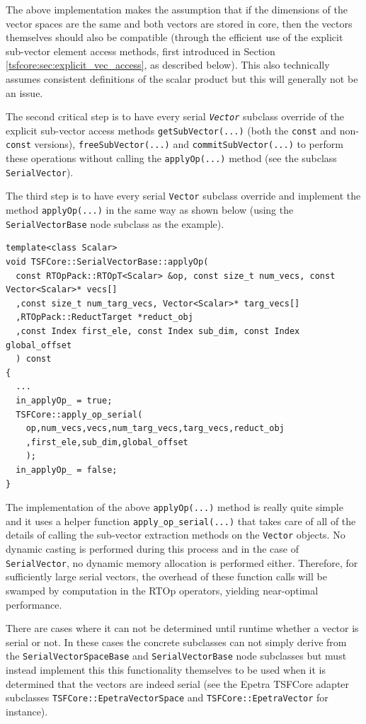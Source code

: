 {}\noindent{}The above implementation makes the assumption that if the
dimensions of the vector spaces are the same and both vectors are
stored in core, then the vectors themselves should also be compatible
(through the efficient use of the explicit sub-vector element access
methods, first introduced in Section
{}\ref{tsfcore:sec:explicit_vec_access}, as described below).  This
also technically assumes consistent definitions of the scalar product
but this will generally not be an issue.

The second critical step is to have every serial
{}\texttt{\textit{Vector}} subclass override of the explicit
sub-vector access methods {}\texttt{getSubVector(...)} (both the
{}\texttt{const} and non-\texttt{const} versions),
{}\texttt{free\-Sub\-Vector(...)} and
{}\texttt{commit\-Sub\-Vector(...)} to perform these operations
without calling the {}\texttt{applyOp(\-...)} method (see the subclass
{}\texttt{SerialVector}).

The third step is to have every serial {}\texttt{Vector} subclass
override and implement the method {}\texttt{applyOp(\-...)} in the
same way as shown below (using the {}\texttt{SerialVectorBase} node
subclass as the example).

{\scriptsize\begin{verbatim}
template<class Scalar>
void TSFCore::SerialVectorBase::applyOp(
  const RTOpPack::RTOpT<Scalar> &op, const size_t num_vecs, const Vector<Scalar>* vecs[]
  ,const size_t num_targ_vecs, Vector<Scalar>* targ_vecs[]
  ,RTOpPack::ReductTarget *reduct_obj
  ,const Index first_ele, const Index sub_dim, const Index global_offset
  ) const
{
  ...
  in_applyOp_ = true;
  TSFCore::apply_op_serial(
    op,num_vecs,vecs,num_targ_vecs,targ_vecs,reduct_obj
    ,first_ele,sub_dim,global_offset
    );
  in_applyOp_ = false;
}
\end{verbatim}}

{}\noindent{}The implementation of the above {}\texttt{applyOp(\-...)}
method is really quite simple and it uses a helper function
{}\texttt{apply\_op\_serial(...)}  that takes care of all of the
details of calling the sub-vector extraction methods on the
{}\texttt{Vector} objects.  No dynamic casting is performed during
this process and in the case of {}\texttt{SerialVector}, no dynamic
memory allocation is performed either.  Therefore, for sufficiently
large serial vectors, the overhead of these function calls will be
swamped by computation in the RTOp operators, yielding near-optimal
performance.

There are cases where it can not be determined until runtime whether a
vector is serial or not.  In these cases the concrete subclasses can
not simply derive from the {}\texttt{Serial\-VectorSpace\-Base} and
{}\texttt{SerialVectorBase} node subclasses but must instead implement
this this functionality themselves to be used when it is determined
that the vectors are indeed serial (see the Epetra TSFCore adapter
subclasses {}\texttt{TSFCore::EpetraVectorSpace} and
{}\texttt{TSFCore::EpetraVector} for instance).

